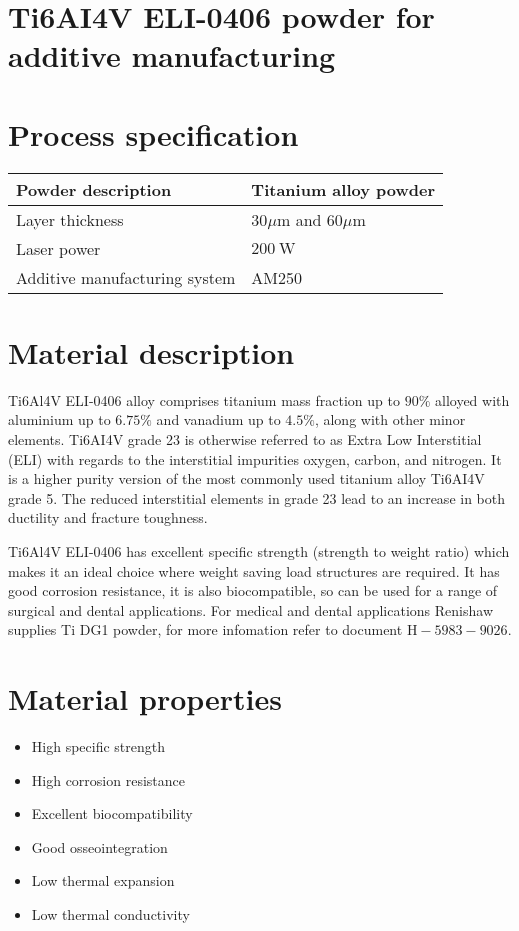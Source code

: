 \documentclass[10pt]{article}
\begin{document}
\section*{Ti6AI4V ELI-0406 powder for additive manufacturing}
\section*{Process specification}
\begin{center}
\begin{tabular}{|l|l|}
\hline
Powder description & Titanium alloy powder \\
\hline
Layer thickness & $30 \mu \mathrm{m}$ and $60 \mu \mathrm{m}$ \\
\hline
Laser power & $200 \mathrm{~W}$ \\
\hline
Additive manufacturing system & AM250 \\
\hline
\end{tabular}
\end{center}

\section*{Material description}
Ti6Al4V ELI-0406 alloy comprises titanium mass fraction up to $90 \%$ alloyed with aluminium up to $6.75 \%$ and vanadium up to $4.5 \%$, along with other minor elements. Ti6AI4V grade 23 is otherwise referred to as Extra Low Interstitial (ELI) with regards to the interstitial impurities oxygen, carbon, and nitrogen. It is a higher purity version of the most commonly used titanium alloy Ti6AI4V grade 5. The reduced interstitial elements in grade 23 lead to an increase in both ductility and fracture toughness.

Ti6Al4V ELI-0406 has excellent specific strength (strength to weight ratio) which makes it an ideal choice where weight saving load structures are required. It has good corrosion resistance, it is also biocompatible, so can be used for a range of surgical and dental applications. For medical and dental applications Renishaw supplies Ti DG1 powder, for more infomation refer to document $\mathrm{H}-5983-9026$.

\section*{Material properties}
\begin{itemize}
  \item High specific strength

  \item High corrosion resistance

  \item Excellent biocompatibility

  \item Good osseointegration

  \item Low thermal expansion

  \item Low thermal conductivity

\end{itemize}
\end{document}
